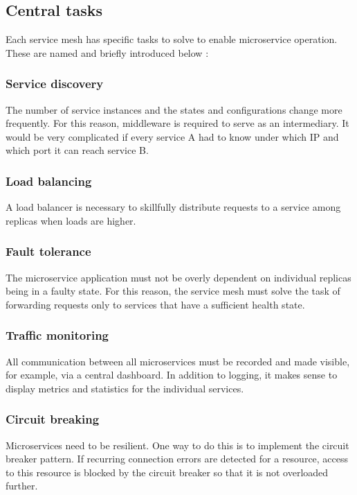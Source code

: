 \subsection{Central tasks}

Each service mesh has specific tasks to solve to enable microservice operation. These are named and briefly introduced below \cite{sm1}:

\subsubsection{Service discovery}

The number of service instances and the states and configurations change more frequently. For this reason, middleware is required to serve as an intermediary. It would be very complicated if every service A had to know under which IP and which port it can reach service B.

\subsubsection{Load balancing}

A load balancer is necessary to skillfully distribute requests to a service among replicas when loads are higher.

\subsubsection{Fault tolerance}

The microservice application must not be overly dependent on individual replicas being in a faulty state. For this reason, the service mesh must solve the task of forwarding requests only to services that have a sufficient health state.

\subsubsection{Traffic monitoring}

All communication between all microservices must be recorded and made visible, for example, via a central dashboard. In addition to logging, it makes sense to display metrics and statistics for the individual services.

\subsubsection{Circuit breaking}
Microservices need to be resilient. One way to do this is to implement the circuit breaker pattern. If recurring connection errors are detected for a resource, access to this resource is blocked by the circuit breaker so that it is not overloaded further.

